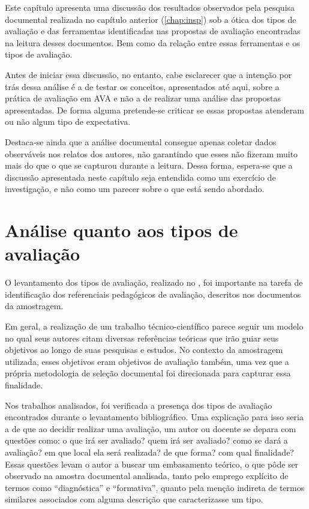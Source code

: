 
\label{chap:results}
Este capítulo apresenta uma discussão dos resultados observados pela pesquisa documental realizada no capítulo anterior (\ref{chap:insp}) sob a ótica dos tipos de avaliação e das ferramentas identificadas nas propostas de avaliação encontradas na leitura desses documentos. Bem como da relação entre essas ferramentas e os tipos de avaliação. 

Antes de iniciar essa discussão, no entanto, cabe esclarecer que a intenção por trás dessa análise é a de testar os conceitos, apresentados até aqui, sobre a prática de avaliação em AVA e não a de realizar uma análise das propostas apresentadas. De forma alguma pretende-se criticar se essas propostas atenderam ou não algum tipo de expectativa. 

Destaca-se ainda que a análise documental consegue apenas coletar dados observáveis nos relatos dos autores, não garantindo que esses não fizeram muito mais do que o que se capturou durante a leitura. Dessa forma, espera-se que a discussão apresentada neste capítulo seja entendida como um exercício de investigação, e não como um parecer sobre o que está sendo abordado.

\section{Análise quanto aos tipos de avaliação}%
\label{sec:analise_aval}
O levantamento dos tipos de avaliação, realizado no , foi importante na tarefa de identificação dos referenciais pedagógicos de avaliação, descritos nos documentos da amostragem. 

Em geral, a realização de um trabalho técnico-científico parece seguir um modelo no qual seus autores citam diversas referências teóricas que irão guiar seus objetivos ao longo de suas pesquisas e estudos. No contexto da amostragem utilizada, esses objetivos eram objetivos de avaliação também, uma vez que a própria metodologia de seleção documental foi direcionada para capturar essa finalidade. 

Nos trabalhos analisados, foi verificada a presença dos tipos de avaliação encontrados durante o levantamento bibliográfico. Uma explicação para isso seria a de que ao decidir realizar uma avaliação, um autor ou docente se depara com questões como: o que irá ser avaliado? quem irá ser avaliado? como se dará a avaliação? em que local ela será realizada? de que forma? com qual finalidade? Essas questões levam o autor a buscar um embasamento teórico, o que pôde ser observado na amostra documental analisada, tanto pelo emprego explícito de termos como ``diagnóstica'' e ``formativa'', quanto pela menção indireta de termos similares associados com alguma descrição que caracterizasse um tipo. 

